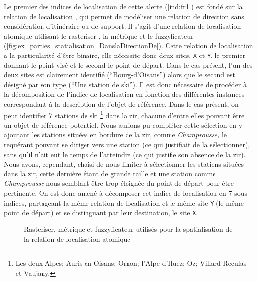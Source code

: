 Le premier des indices de localisation de cette alerte (\ref{ind:fr1})
est fondé sur la relation de localisation
, qui permet de
modéliser une relation de direction sans considération d'itinéraire ou
de support. Il s'agit d'une relation de localisation atomique
utilisant le rasteriser , la métrique
 et le fuzzyficateur
(\autoref{fig:ex_parties_statialisation_DanslaDirectionDe}). Cette
relation de localisation a la particularité d'être binaire, elle
nécessite donc deux sites, \texttt{X} et \texttt{Y}, le premier
donnant le point visé et le second le point de départ. Dans le cas
présent, l'un des deux sites est clairement identifié
(\enquote{Bourg-d'Oisans}) alors que le second est désigné par son
type (\enquote{Une station de ski}). Il est donc nécessaire de
procéder à la décomposition de l'indice de localisation en fonction
des différentes instances correspondant à la description de l'objet de
référence. Dans le cas présent, on peut identifier 7 stations de ski
\footnote{Les deux Alpes; Auris en Oisans; Ornon; l'Alpe d'Huez; Oz;
  Villard-Reculas et Vaujany.}  dans la \ac{zir}, chacune d'entre
elles pouvant être un objet de référence potentiel. Nous aurions pu
compléter cette sélection en y ajoutant les stations situées en
bordure de la \ac{zir}, comme \emph{Champrousse,} le requérant pouvant
se diriger vers une station (ce qui justifiait de la sélectionner),
sans qu'il n'ait eut le temps de l'atteindre (ce qui justifie son
absence de la \ac{zir}). Nous avons, cependant, choisi de nous limiter
à sélectionner les stations situées dans la \ac{zir}, cette dernière
étant de grande taille et une station comme \emph{Champrousse} nous
semblant être trop éloignée du point de départ pour être pertinente.
On est donc amené à décomposer cet indice de localisation en 7
sous-indices, partageant la même relation de localisation et le même
site \texttt{Y} (\ie le même point de départ) et se distinguant par
leur destination, le site \texttt{X}.

\begin{figure}
  \centering
  
  \caption{Rasteriser, métrique et fuzzyficateur utilisés pour la
    spatialisation de la relation de localisation atomique
    \protect{}}
  \label{fig:ex_parties_statialisation_DanslaDirectionDe}
\end{figure}

